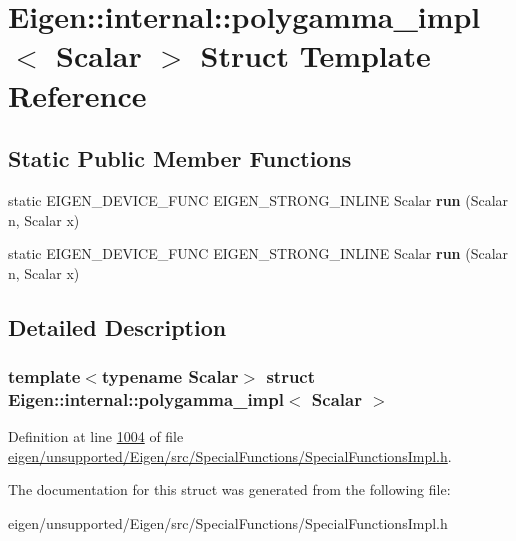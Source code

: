 \hypertarget{struct_eigen_1_1internal_1_1polygamma__impl}{}\section{Eigen\+:\+:internal\+:\+:polygamma\+\_\+impl$<$ Scalar $>$ Struct Template Reference}
\label{struct_eigen_1_1internal_1_1polygamma__impl}
\subsection*{Static Public Member Functions}
\begin{DoxyCompactItemize}
\item 
\mbox{\label{struct_eigen_1_1internal_1_1polygamma__impl_af82ca97b90b2cf3d0c2416047f02a56a}} 
static E\+I\+G\+E\+N\+\_\+\+D\+E\+V\+I\+C\+E\+\_\+\+F\+U\+NC E\+I\+G\+E\+N\+\_\+\+S\+T\+R\+O\+N\+G\+\_\+\+I\+N\+L\+I\+NE Scalar {\bfseries run} (Scalar n, Scalar x)
\item 
\mbox{\label{struct_eigen_1_1internal_1_1polygamma__impl_af82ca97b90b2cf3d0c2416047f02a56a}} 
static E\+I\+G\+E\+N\+\_\+\+D\+E\+V\+I\+C\+E\+\_\+\+F\+U\+NC E\+I\+G\+E\+N\+\_\+\+S\+T\+R\+O\+N\+G\+\_\+\+I\+N\+L\+I\+NE Scalar {\bfseries run} (Scalar n, Scalar x)
\end{DoxyCompactItemize}


\subsection{Detailed Description}
\subsubsection*{template$<$typename Scalar$>$\newline
struct Eigen\+::internal\+::polygamma\+\_\+impl$<$ Scalar $>$}



Definition at line \hyperlink{eigen_2unsupported_2_eigen_2src_2_special_functions_2_special_functions_impl_8h_source_l01004}{1004} of file \hyperlink{eigen_2unsupported_2_eigen_2src_2_special_functions_2_special_functions_impl_8h_source}{eigen/unsupported/\+Eigen/src/\+Special\+Functions/\+Special\+Functions\+Impl.\+h}.



The documentation for this struct was generated from the following file\+:\begin{DoxyCompactItemize}
\item 
eigen/unsupported/\+Eigen/src/\+Special\+Functions/\+Special\+Functions\+Impl.\+h\end{DoxyCompactItemize}
